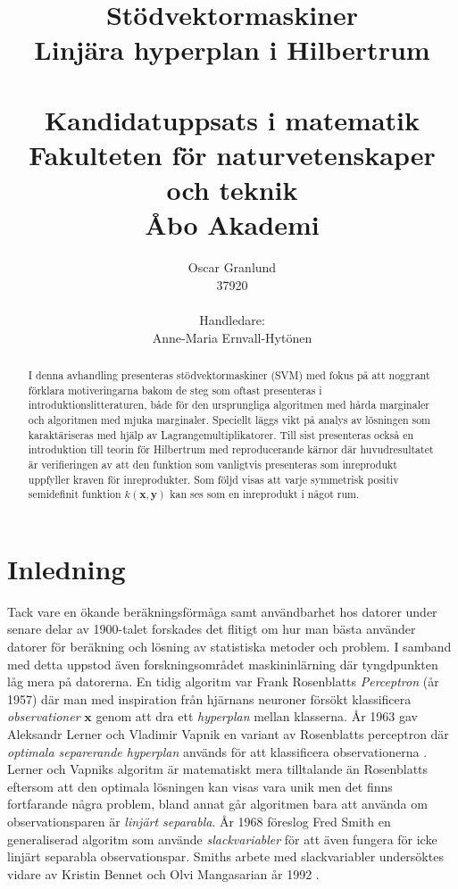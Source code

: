 \documentclass[a4paper, 12pt]{report}
\title{{\Huge Stödvektormaskiner}\\
{\Large Linjära hyperplan i Hilbertrum}\\
~\\
{\large Kandidatuppsats i matematik}\\
{\large Fakulteten för naturvetenskaper och teknik}\\
{\large Åbo Akademi}}
\author{{\Large Oscar Granlund}\\
{\Large37920}\\
\\
{\large Handledare:}\\{\large Anne-Maria Ernvall-Hytönen}}
\theoremstyle{definition}
\theoremstyle{remark}
\newcommand{\bfx}{\mathbf{x}}
\newcommand{\bfy}{\mathbf{y}}
\begin{document}
\maketitle

\begin{abstract}
	I denna avhandling presenteras stödvektormaskiner (SVM) med fokus på att noggrant förklara motiveringarna bakom de steg som oftast presenteras i introduktionslitteraturen, både för den ursprungliga algoritmen med hårda marginaler och algoritmen med mjuka marginaler. Speciellt läggs vikt på analys av lösningen som karaktäriseras med hjälp av Lagrangemultiplikatorer. Till sist presenteras också en introduktion till teorin för Hilbertrum med reproducerande kärnor där huvudresultatet är verifieringen av att den funktion som vanligtvis presenteras som inreprodukt uppfyller kraven för inreprodukter. Som följd visas att varje symmetrisk positiv semidefinit funktion $k\left(\bfx, \bfy\right)$ kan ses som en inreprodukt i något rum.
\end{abstract}

\tableofcontents

\chapter{Inledning}
Tack vare en ökande beräkningsförmåga samt användbarhet hos datorer under senare delar av 1900-talet forskades det flitigt om hur man bästa använder datorer för beräkning och lösning av statistiska metoder och problem.
I samband med detta uppstod även forskningsområdet maskininlärning där tyngdpunkten låg mera på datorerna.
En tidig algoritm var Frank Rosenblatts \emph{Perceptron} (år 1957) \cite{Rosenblatt} där man med inspiration från hjärnans neuroner försökt klassificera \emph{observationer} $\mathbf{x}$ genom att dra ett \emph{hyperplan} mellan klasserna.
År 1963 gav Aleksandr Lerner och Vladimir Vapnik en variant av Rosenblatts perceptron där \emph{optimala separerande hyperplan} används för att klassificera observationerna \cite{VapnikLerner1963}.
Lerner och Vapniks algoritm är matematiskt mera tilltalande än Rosenblatts eftersom att den optimala lösningen kan visas vara unik men det finns fortfarande några problem, bland annat går algoritmen bara att använda om observationsparen är \emph{linjärt separabla}.
År 1968 föreslog Fred Smith \cite{Smith} en generaliserad algoritm som använde \emph{slackvariabler} för att även fungera för icke linjärt separabla observationspar.
Smiths arbete med slackvariabler undersöktes vidare av Kristin Bennet och Olvi Mangasarian år 1992 \cite{BennetMangasarian}.
\end{document}
